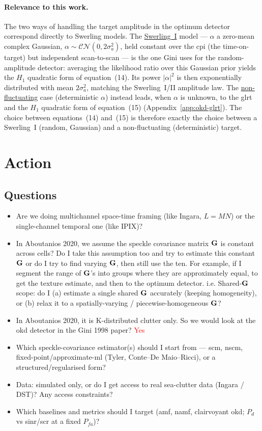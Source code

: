 \documentclass{article}
\begin{document}
\paragraph{Relevance to this work.}
The two ways of handling the target amplitude in the optimum detector correspond directly to Swerling models. The \underline{Swerling~I} model --- $\alpha$ a zero-mean complex Gaussian, $\alpha\sim\mathcal{CN}(0,2\sigma_a^2)$, held constant over the \gls{cpi} (the time-on-target) but independent scan-to-scan --- is the one Gini uses for the random-amplitude detector: averaging the likelihood ratio over this Gaussian prior yields the $H_1$ quadratic form of equation~(14). Its power $|\alpha|^2$ is then exponentially distributed with mean $2\sigma_a^2$, matching the Swerling~I/II amplitude law. The \underline{non-fluctuating} case (deterministic $\alpha$) instead leads, when $\alpha$ is unknown, to the \gls{glrt} and the $H_1$ quadratic form of equation~(15) (Appendix~\ref{app:okd-glrt}). The choice between equations~(14) and~(15) is therefore exactly the choice between a Swerling~I (random, Gaussian) and a non-fluctuating (deterministic) target.

\newpage
\section{Action}
\subsection{Questions}
\begin{itemize}
    \item Are we doing multichannel space-time framing (like Ingara, $L = MN$) or the single-channel temporal one (like IPIX)?
    \item In Aboutanios 2020, we assume the speckle covariance matrix $\mathbf{G}$ is constant across cells? Do I take this assumption too and try to estimate this constant $\mathbf{G}$ or do I try to find varying $\mathbf{G}$, then still use the \gls{ten}. For example, if I segment the range of $\mathbf{G}$'s into groups where they are approximately equal, to get the texture estimate, and then to the optimum detector. i.e. Shared-$\mathbf{G}$ scope: do I (a) estimate a single shared $\mathbf{G}$ accurately (keeping homogeneity), or (b) relax it to a spatially-varying / piecewise-homogeneous $\mathbf{G}$?
    \item In Aboutanios 2020, it is K-distributed clutter only. So we would look at the \gls{okd} detector in the Gini 1998 paper? \textcolor{red}{Yes}
    \item Which speckle-covariance estimator(s) should I start from --- \gls{scm}, \gls{nscm}, fixed-point/approximate-\gls{ml} (Tyler, Conte--De Maio--Ricci), or a structured/regularised form?
    \item Data: simulated only, or do I get access to real sea-clutter data (Ingara / DST)? Any access constraints?
    \item Which baselines and metrics should I target (\gls{amf}, \gls{namf}, clairvoyant \gls{okd}; $P_d$ vs \gls{sinr}/\gls{scr} at a fixed $P_{fa}$)?
\end{itemize}
\end{document}

